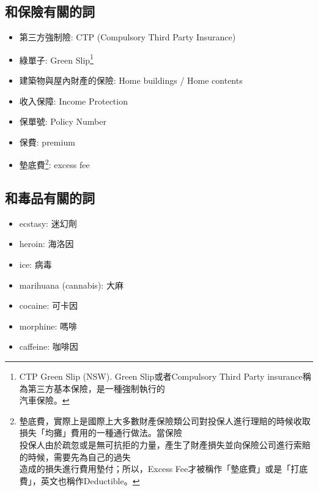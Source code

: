 \subsection{和保險有關的詞}
\begin{multicols}{2}
\begin{itemize}
  \itemsep0em
  \item 第三方強制險: CTP (Compulsory Third Party Insurance)
  \item 綠單子: Green Slip\footnote{CTP Green Slip (NSW). Green Slip或者Compulsory Third Party insurance稱為第三方基本保險，是一種強制執行的\\汽車保險。}
  \item 建築物與屋內財產的保險: Home buildings / Home contents
  \item 收入保障: Income Protection
  \item 保單號: Policy Number
  \item 保費: premium
  \item 墊底費\footnote{墊底費，實際上是國際上大多數財產保險類公司對投保人進行理賠的時候收取損失「均攤」費用的一種通行做法。當保險\\投保人由於疏忽或是無可抗拒的力量，產生了財產損失並向保險公司進行索賠的時候，需要先為自己的過失 \\ 造成的損失進行費用墊付；所以，Excess Fee才被稱作「墊底費」或是「打底費」，英文也稱作Deductible。}: excess fee
\end{itemize}
\end{multicols}

\subsection{和毒品有關的詞}
\begin{multicols}{2}
\begin{itemize}
  \itemsep0em
  \item ecstasy: 迷幻劑
  \item heroin: 海洛因
  \item ice: 病毒
  \item marihuana (cannabis): 大麻
  \item cocaine: 可卡因
  \item morphine: 嗎啡
  \item caffeine: 咖啡因
\end{itemize}
\end{multicols}

